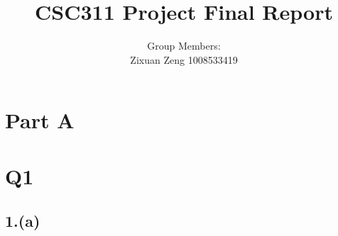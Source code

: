\documentclass{article}
\title{CSC311 Project Final Report}
\author{Group Members: \\ Zixuan Zeng 1008533419}
\begin{document}
\maketitle

\section*{Part A}

\section*{Q1}

\subsection*{1.(a)}
\end{document}
